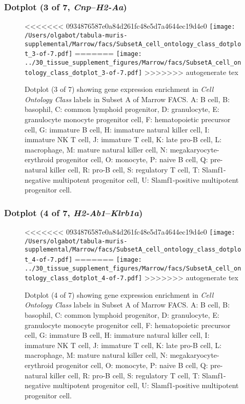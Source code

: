 \clearpage

\subsubsection{Dotplot (3 of 7, \emph{Cnp}--\emph{H2-Aa})}
\begin{figure}[h]
\centering
<<<<<<< 0934876587e0a84d261fc48e5d7a4644ec19d4e0
\texttt{[image: /Users/olgabot/tabula-muris-supplemental/Marrow/facs/SubsetA\_cell\_ontology\_class\_dotplot\_3-of-7.pdf]}
=======
\texttt{[image: ../30\_tissue\_supplement\_figures/Marrow/facs/SubsetA\_cell\_ontology\_class\_dotplot\_3-of-7.pdf]}
>>>>>>> autogenerate tex

\caption{ Dotplot (3 of 7)  showing gene expression enrichment in \emph{Cell Ontology Class} labels in Subset A of Marrow FACS. A: B cell, B: basophil, C: common lymphoid progenitor, D: granulocyte, E: granulocyte monocyte progenitor cell, F: hematopoietic precursor cell, G: immature B cell, H: immature natural killer cell, I: immature NK T cell, J: immature T cell, K: late pro-B cell, L: macrophage, M: mature natural killer cell, N: megakaryocyte-erythroid progenitor cell, O: monocyte, P: naive B cell, Q: pre-natural killer cell, R: pro-B cell, S: regulatory T cell, T: Slamf1-negative multipotent progenitor cell, U: Slamf1-positive multipotent progenitor cell.}
\end{figure}


\clearpage

\subsubsection{Dotplot (4 of 7, \emph{H2-Ab1}--\emph{Klrb1a})}
\begin{figure}[h]
\centering
<<<<<<< 0934876587e0a84d261fc48e5d7a4644ec19d4e0
\texttt{[image: /Users/olgabot/tabula-muris-supplemental/Marrow/facs/SubsetA\_cell\_ontology\_class\_dotplot\_4-of-7.pdf]}
=======
\texttt{[image: ../30\_tissue\_supplement\_figures/Marrow/facs/SubsetA\_cell\_ontology\_class\_dotplot\_4-of-7.pdf]}
>>>>>>> autogenerate tex

\caption{ Dotplot (4 of 7)  showing gene expression enrichment in \emph{Cell Ontology Class} labels in Subset A of Marrow FACS. A: B cell, B: basophil, C: common lymphoid progenitor, D: granulocyte, E: granulocyte monocyte progenitor cell, F: hematopoietic precursor cell, G: immature B cell, H: immature natural killer cell, I: immature NK T cell, J: immature T cell, K: late pro-B cell, L: macrophage, M: mature natural killer cell, N: megakaryocyte-erythroid progenitor cell, O: monocyte, P: naive B cell, Q: pre-natural killer cell, R: pro-B cell, S: regulatory T cell, T: Slamf1-negative multipotent progenitor cell, U: Slamf1-positive multipotent progenitor cell.}
\end{figure}


